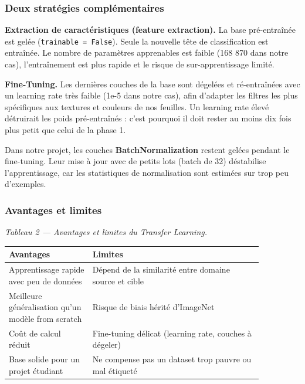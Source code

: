 \documentclass[10pt,a4paper]{article}
\begin{document}
\subsubsection{Deux stratégies complémentaires}

\textbf{Extraction de caractéristiques (feature extraction).} La base pré-entraînée est gelée (\texttt{trainable = False}). Seule la nouvelle tête de classification est entraînée. Le nombre de paramètres apprenables est faible (168 870 dans notre cas), l'entraînement est plus rapide et le risque de sur-apprentissage limité.

\textbf{Fine-Tuning.} Les dernières couches de la base sont dégelées et ré-entraînées avec un learning rate très faible (1e-5 dans notre cas), afin d'adapter les filtres les plus spécifiques aux textures et couleurs de nos feuilles. Un learning rate élevé détruirait les poids pré-entraînés : c'est pourquoi il doit rester au moins dix fois plus petit que celui de la phase 1.

Dans notre projet, les couches \textbf{BatchNormalization} restent gelées pendant le fine-tuning. Leur mise à jour avec de petits lots (batch de 32) déstabilise l'apprentissage, car les statistiques de normalisation sont estimées sur trop peu d'exemples.

\subsubsection{Avantages et limites}

\begin{center}\small\itshape Tableau 2 --- Avantages et limites du Transfer Learning.\end{center}
{\footnotesize
\begin{longtable}{@{}>{\raggedright\arraybackslash}p{0.28\linewidth}>{\raggedright\arraybackslash}p{0.58\linewidth}@{}}
\toprule
\textbf{Avantages} & \textbf{Limites} \\
\midrule
\endhead
\bottomrule
\endlastfoot
Apprentissage rapide avec peu de données & Dépend de la similarité entre domaine source et cible \\
Meilleure généralisation qu'un modèle from scratch & Risque de biais hérité d'ImageNet \\
Coût de calcul réduit & Fine-tuning délicat (learning rate, couches à dégeler) \\
Base solide pour un projet étudiant & Ne compense pas un dataset trop pauvre ou mal étiqueté \\
\end{longtable}
}
\end{document}
